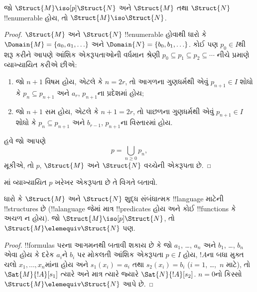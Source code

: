 \documentclass[../../../include/open-logic-section]{subfiles}
\begin{document}
\begin{thm}
  જો $\Struct{M} \iso[p] \Struct{N}$ અને $\Struct{M}$ તથા
  $\Struct{N}$ !!{enumerable} હોય, તો $\Struct{M} \iso \Struct{N}$.
\end{thm}

\begin{proof}
  $\Struct{M}$ અને $\Struct{N}$ !!{enumerable} હોવાથી ધારો કે
  $\Domain{M} = \{a_0, a_1, \ldots \}$ અને $\Domain{N} =
  \{b_0, b_1, \ldots \}$. કોઈ પણ $p_0 \in I$થી શરૂ કરીને આપણે આંશિક
  એકરૂપતાઓની વર્ધમાન શ્રેણી $p_0 \subseteq p_1 \subseteq p_2
  \subseteq \cdots$ નીચે પ્રમાણે વ્યાખ્યાયિત કરીએ છીએ:
  \begin{enumerate}
  \item જો $n+1$ વિષમ હોય, એટલે કે $n = 2r$, તો આગળના ગુણધર્મથી એવું
    $p_{n+1} \in I$ શોધો કે $p_n \subseteq p_{n+1}$ અને $a_r$,
    $p_{n+1}$ના પ્રદેશમાં હોય;
  \item જો $n+1$ સમ હોય, એટલે કે $n+1 =2r$, તો પાછળના ગુણધર્મથી એવું
    $p_{n+1} \in I$ શોધો કે $p_n \subseteq p_{n+1}$ અને $b_{r-1}$,
    $p_{n+1}$ના વિસ્તારમાં હોય.
  \end{enumerate}
હવે જો આપણે
\[
p = \bigcup_{n\ge 0} p_n,
\]
મૂકીએ, તો $p$, $\Struct{M}$ અને $\Struct{N}$ વચ્ચેની એકરૂપતા છે.
\end{proof}

\begin{prob}
  માં વ્યાખ્યાયિત $p$ ખરેખર એકરૂપતા
  છે તે વિગતે બતાવો.
\end{prob}

\begin{thm}
  ધારો કે $\Struct{M}$ અને $\Struct{N}$ શુદ્ધ સંબંધાત્મક
  !!{language} માટેની !!{structure}s છે (!!a{language} જેમાં માત્ર
  !!{predicate}s હોય અને કોઈ !!{function}s કે અચળ ન હોય). જો
  $\Struct{M} \iso[p] \Struct{N}$, તો $\Struct{M} \elemequiv
  \Struct{N}$ પણ.
\end{thm}

\begin{proof}
  !!{formula}s પરના આગમનથી બતાવી શકાય છે કે જો $a_1$, \dots, $a_n$ અને
  $b_1$, \dots, $b_n$ એવા હોય કે દરેક $a_i$ને $b_i$ પર મોકલતી આંશિક
  એકરૂપતા $p\in I$ હોય, $!A$ના બધા મુક્ત ચલો $x_1,\dots,x_n$માંના હોય
  અને $s_1(x_i) =a_i$ તથા $s_2(x_i) =b_i$
  ($i =1$, \dots,~$n$ માટે), તો $\Sat{M}{!A}[s_1]$ ત્યારે અને માત્ર
  ત્યારે જ્યારે $\Sat{N}{!A}[s_2]$. $n=0$નો કિસ્સો
  $\Struct{M} \elemequiv \Struct{N}$ આપે છે.
\end{proof}
\end{document}
